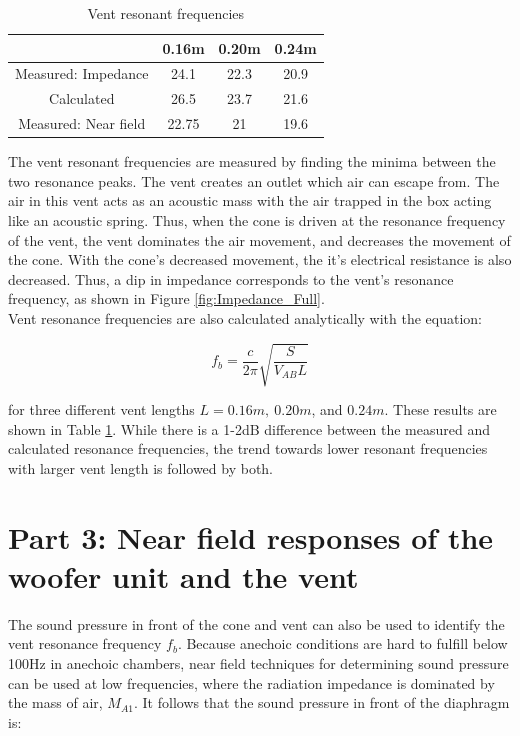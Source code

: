 \documentclass[a4paper,10pt]{article}
\begin{document}
\begin{table}[H]
    \centering
    \begin{tabular}{c|c|c|c}
         & 0.16m & 0.20m & 0.24m \\
         \hline
        Measured: Impedance & 24.1 & 22.3 & 20.9\\
        \hline
        Calculated & 26.5 & 23.7 & 21.6\\
        \hline
        Measured: Near field & 22.75 & 21 & 19.6\\
        \hline
    \end{tabular}
    \caption{Vent resonant frequencies}
    \label{tab:ventf}
\end{table}

The vent resonant frequencies are measured by finding the minima between the two resonance peaks. The vent creates an outlet which air can escape from. The air in this vent acts as an acoustic mass with the air trapped in the box acting like an acoustic spring. Thus, when the cone is driven at the resonance frequency of the vent, the vent dominates the air movement, and decreases the movement of the cone. With the cone's decreased movement, the it's electrical resistance is also decreased. Thus, a dip in impedance corresponds to the vent's resonance frequency, as shown in Figure \ref{fig:Impedance_Full}.\\

Vent resonance frequencies are also calculated analytically with the equation:

\begin{equation}
    f_b = \frac{c}{2 \pi} \sqrt{\frac{S}{V_{AB} L}}
    \label{eq:ventfrequency}
\end{equation}

for three different vent lengths $L = 0.16m,\ 0.20m$, and $0.24m$. These results are shown in Table \ref{tab:ventf}. While there is a 1-2dB difference between the measured and calculated resonance frequencies, the trend towards lower resonant frequencies with larger vent length is followed by both.

\section{Part 3: Near field responses of the woofer unit and the vent}

 The sound pressure in front of the cone and vent can also be used to identify the vent resonance frequency $f_b$. Because anechoic conditions are hard to fulfill below 100Hz in anechoic chambers, near field techniques for determining sound pressure can be used at low frequencies, where the radiation impedance is dominated by the mass of air, $M_{A1}$. It follows that the sound pressure in front of the diaphragm is:
\end{document}
